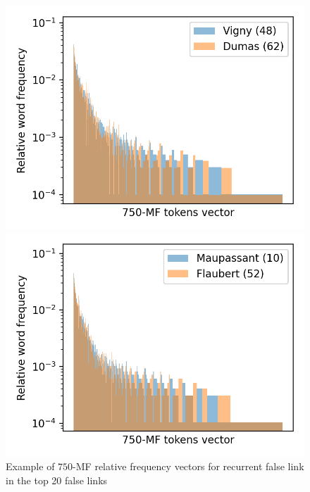\begin{figure}
  \centering
  \caption{Example of $750$-MF relative frequency vectors for recurrent false link in the top 20 false links}
  \label{fig:mf_vector_error}

  \label{fig:mf_vector_error_0}
  \includegraphics[width=\linewidth]{img/mf_vector_error_0.png}

  \vspace{0.5cm}

  \label{fig:mf_vector_error_1}
  \includegraphics[width=\linewidth]{img/mf_vector_error_1.png}
\end{figure}

